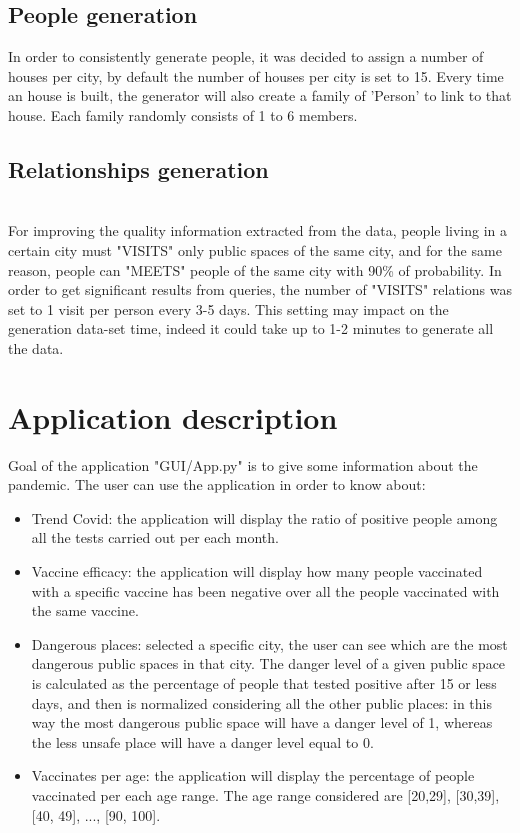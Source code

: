 \documentclass{article}
\begin{document}
\subsection{People generation}
In order to consistently generate people, it was decided to assign a number of houses per city, by default the number of houses per city is set to 15. Every time an house is built, the generator will also create a family of 'Person' to link to that house.
Each family randomly consists of 1 to 6 members.

\subsection{Relationships generation}
\\For improving the quality information extracted from the data, people living in a certain city must "VISITS" only public spaces of the same city, and for the same reason, people can "MEETS" people of the same city with 90\% of probability.
In order to get significant results from queries, the number of "VISITS" relations was set to 1 visit per person every 3-5 days. This setting may impact on the generation data-set time, indeed it could take up to 1-2 minutes to generate all the data.



\section{Application description}
Goal of the application {\selectfont"GUI/App.py"} is to give some information about the pandemic.
The user can use the application in order to know about:
\begin{itemize}
    \item Trend Covid: the application will display the ratio of positive people among all the tests carried out per each month.
    \item Vaccine efficacy: the application will display how many people vaccinated with a specific vaccine has been negative over all
    the people vaccinated with the same vaccine.
    \item Dangerous places: selected a specific city, the user can see which are the most dangerous public spaces in that city. The danger level of
    a given public space is calculated as the percentage of people that tested positive after 15 or less days, and then is normalized considering
    all the other public places: in this way the most dangerous public space will have a danger level of 1,
    whereas the less unsafe place will have a danger level equal to 0.
    \item Vaccinates per age: the application will display the percentage of people vaccinated per each age range.
    The age range considered are [20,29], [30,39], [40, 49], ..., [90, 100].
\end{itemize}
\end{document}
